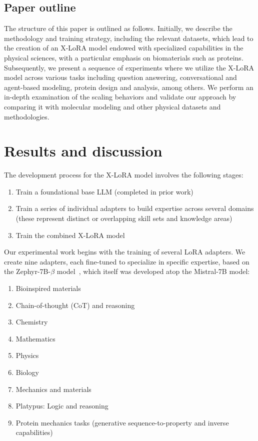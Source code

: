 \subsection{Paper outline}

The structure of this paper is outlined as follows. Initially, we describe the methodology and training strategy, including the relevant datasets, which lead to the creation of an X-LoRA model endowed with specialized capabilities in the physical sciences, with a particular emphasis on biomaterials such as proteins. Subsequently, we present a sequence of experiments where we utilize the X-LoRA model across various tasks including question answering, conversational and agent-based modeling, protein design and analysis, among others. We perform an in-depth examination of the scaling behaviors and validate our approach by comparing it with molecular modeling and other physical datasets and methodologies.

\section{Results and discussion}

The development process for the X-LoRA model involves the following stages:

\begin{enumerate}
    \item Train a foundational base LLM (completed in prior work) 
    \item Train a series of individual adapters to build expertise across several domains (these represent distinct or overlapping skill sets and knowledge areas) 
    \item Train the combined X-LoRA model
\end{enumerate}

Our experimental work begins with the training of several LoRA adapters. We create nine adapters, each fine-tuned to specialize in specific expertise, based on the Zephyr-7B-$\beta$ model~\cite{HuggingFaceH4/zephyr-7b-betaFace}, which itself was developed atop the Mistral-7B model\cite{Jiang2023Mistral7B}:

\begin{enumerate}
    \item Bioinspired materials 
    \item Chain-of-thought (CoT) and reasoning 
    \item Chemistry 
    \item Mathematics 
    \item Physics 
    \item Biology 
    \item Mechanics and materials 
    \item Platypus: Logic and reasoning 
    \item Protein mechanics tasks (generative sequence-to-property and inverse capabilities)
\end{enumerate}

